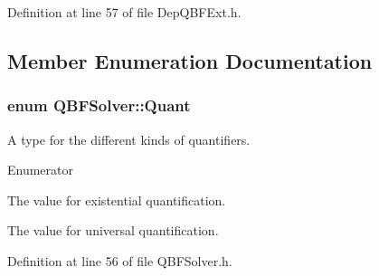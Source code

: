 Definition at line 57 of file Dep\-Q\-B\-F\-Ext.\-h.



\subsection{Member Enumeration Documentation}
\hypertarget{classQBFSolver_ac091e263cb55286cc07b2451bcf4d3c7}{
\subsubsection[{Quant}]{\setlength{\rightskip}{0pt plus 5cm}enum {\bf Q\-B\-F\-Solver\-::\-Quant}\hspace{0.3cm}{\ttfamily [inherited]}}}\label{classQBFSolver_ac091e263cb55286cc07b2451bcf4d3c7}


A type for the different kinds of quantifiers. 

\begin{Desc}
\item[Enumerator]\par
\begin{description}
\item[{\em 
\hypertarget{classQBFSolver_ac091e263cb55286cc07b2451bcf4d3c7a090ab4a5b262710ccd80e97d72f9a7b3}{E}\label{classQBFSolver_ac091e263cb55286cc07b2451bcf4d3c7a090ab4a5b262710ccd80e97d72f9a7b3}
}]The value for existential quantification. \item[{\em 
\hypertarget{classQBFSolver_ac091e263cb55286cc07b2451bcf4d3c7afd6518d5d985aa8346ac071e4c0d8ee0}{A}\label{classQBFSolver_ac091e263cb55286cc07b2451bcf4d3c7afd6518d5d985aa8346ac071e4c0d8ee0}
}]The value for universal quantification. \end{description}
\end{Desc}


Definition at line 56 of file Q\-B\-F\-Solver.\-h.



